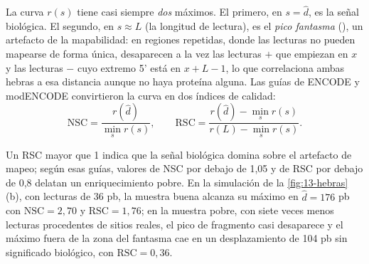 La curva $r(s)$ tiene casi siempre \emph{dos} máximos. El primero, en $s=\hat d$, es la señal biológica. El segundo, en $s\approx L$ (la longitud de lectura), es el \emph{pico fantasma} (), un artefacto de la mapabilidad: en regiones repetidas, donde las lecturas no pueden mapearse de forma única, desaparecen a la vez las lecturas $+$ que empiezan en $x$ y las lecturas $-$ cuyo extremo 5' está en $x+L-1$, lo que correlaciona ambas hebras a esa distancia aunque no haya proteína alguna. Las guías de ENCODE y modENCODE \parencite{c13-landt2012} convirtieron la curva en dos índices de calidad:
\begin{equation}\label{eq:13-nsc}
\mathrm{NSC} = \frac{r(\hat d)}{\min_s r(s)},\qquad
\mathrm{RSC} = \frac{r(\hat d)-\min_s r(s)}{r(L)-\min_s r(s)} .
\end{equation}
\begin{simbolos}
\end{simbolos}
Un RSC mayor que 1 indica que la señal biológica domina sobre el artefacto de mapeo; según esas guías, valores de NSC por debajo de 1,05 y de RSC por debajo de 0,8 delatan un enriquecimiento pobre. En la simulación de la \cref{fig:13-hebras}\,(b), con lecturas de 36 pb, la muestra buena alcanza su máximo en $\hat d=176$ pb con $\mathrm{NSC}=2{,}70$ y $\mathrm{RSC}=1{,}76$; en la muestra pobre, con siete veces menos lecturas procedentes de sitios reales, el pico de fragmento casi desaparece y el máximo fuera de la zona del fantasma cae en un desplazamiento de 104 pb sin significado biológico, con $\mathrm{RSC}=0{,}36$.

